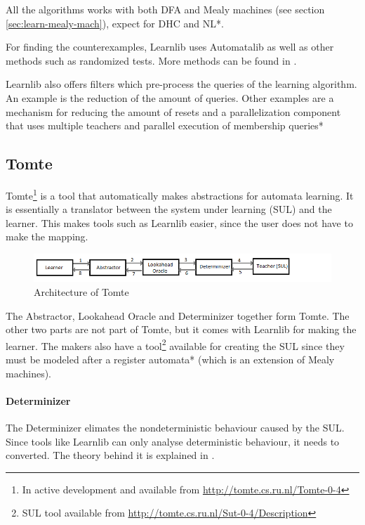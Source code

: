 \documentclass[multi,crop=false,class=article]{standalone}
\begin{document}
All the algorithms works with both DFA and Mealy machines (see section 
\ref{sec:learn-mealy-mach}), expect for 
DHC\cite{Merten2012} and NL*\cite{Bollig2009}.

For finding the counterexamples, Learnlib uses Automatalib as well as other
methods such as randomized tests. More methods can be found in 
\cite{Isberner2015b}.

Learnlib also offers filters which pre-process the queries of the learning 
algorithm. An example is the reduction of the amount of queries. Other examples 
are a mechanism for reducing the amount of resets\cite{Bauer2012} and a 
parallelization component that uses multiple teachers and parallel execution of 
membership queries\cite{Henrix2015,Howar2012}*     


\subsection{Tomte}
\label{ssec:tomte}
Tomte\footnote{In active development and available from
\url{http://tomte.cs.ru.nl/Tomte-0-4}} is a tool that automatically makes
abstractions for automata learning. It is essentially a translator between the
system under learning (SUL) and the learner. This makes tools such as Learnlib 
easier, since the user does not have to make the mapping.

\begin{figure}[!ht]
	\includegraphics[width=\textwidth]{Tool_images/tomte_network.png}
	\caption{Architecture of Tomte}
	\label{fig:tomte_arch_interaction}
\end{figure}

The Abstractor, Lookahead Oracle and Determinizer together form Tomte. The
other two parts are not part of Tomte, but it comes with Learnlib for making 
the learner. The makers also have a tool\footnote{SUL tool available from 
\url{http://tomte.cs.ru.nl/Sut-0-4/Description}} available for creating the SUL 
since they must be modeled after a register automata\cite{Aarts2015,Tomte2014}* 
(which is an extension of Mealy machines).

\paragraph{Determinizer} The Determinizer elimates the nondeterministic
behaviour caused by the SUL. Since tools like Learnlib can only analyse
deterministic behaviour, it needs to converted. The theory behind it is
explained in \cite{Aarts2015}.
\end{document}
